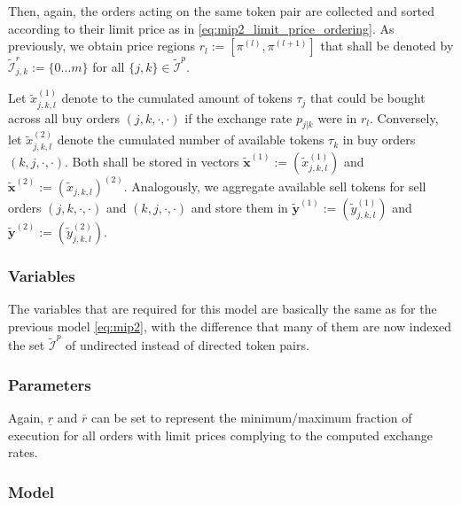 \documentclass[11pt,parskip=full]{scrartcl}%
\newcommand*{\iutokenpairs}{\tilde{\mathcal{I}}^p}   %
\begin{document}
Then, again, the orders acting on the same token pair are collected and sorted according to their
limit price as in \eqref{eq:mip2_limit_price_ordering}.
As previously, we obtain price regions $ r_l := [\pi^{(l)},\pi^{(l+1)}] $ that shall be denoted by
$ \tilde{\mathcal{I}}_{j,k}^r := \{0 \ldots m\} $ for all $ \{j,k\} \in \iutokenpairs $.

Let $ \tilde{x}_{j,k,l}^{(1)} $ denote to the cumulated amount of tokens $ \tau_j $ that could be
bought across all buy orders $ (j,k,\cdot,\cdot) $ if the exchange rate $ p_{j|k} $ were in
$ r_l $.
Conversely, let $ \tilde{x}_{j,k,l}^{(2)} $ denote the cumulated number of available tokens
$ \tau_k $ in buy orders $ (k,j,\cdot,\cdot) $.
Both shall be stored in vectors $ \tilde{\mathbf{x}}^{(1)} := (\tilde{x}_{j,k,l}^{(1)}) $ and
$ \tilde{\mathbf{x}}^{(2)} := (\tilde{x}_{j,k,l})^{(2)} $.
Analogously, we aggregate available sell tokens for sell orders $ (j,k,\cdot,\cdot) $ and
$ (k,j,\cdot,\cdot) $ and store them in $ \tilde{\mathbf{y}}^{(1)} := (\tilde{y}_{j,k,l}^{(1)}) $
and $ \tilde{\mathbf{y}}^{(2)} := (\tilde{y}_{j,k,l}^{(2)}) $.


\subsubsection*{Variables}

The variables that are required for this model are basically the same as for the previous model
\eqref{eq:mip2}, with the difference that many of them are now indexed the set $ \iutokenpairs $ of
undirected instead of directed token pairs.


\subsubsection*{Parameters}

Again, $ \underline{r} $ and $ \overline{r} $ can be set to represent the minimum/maximum fraction
of execution for all orders with limit prices complying to the computed exchange rates.


\subsubsection*{Model}
\end{document}
